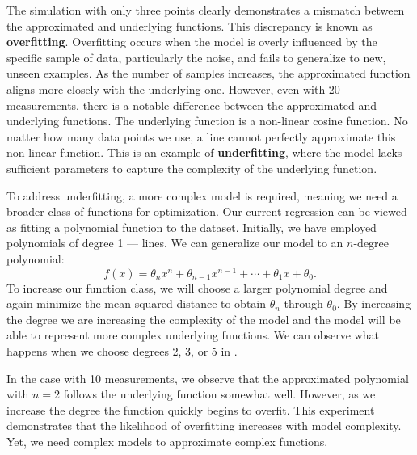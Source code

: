 The simulation with only three points clearly demonstrates a mismatch between the approximated and underlying functions. This discrepancy is known as \textbf{overfitting}. Overfitting occurs when the model is overly influenced by the specific sample of data, particularly the noise, and fails to generalize to new, unseen examples. As the number of samples increases, the approximated function aligns more closely with the underlying one. However, even with 20 measurements, there is a notable difference between the approximated and underlying functions. The underlying function is a non-linear cosine function. No matter how many data points we use, a line cannot perfectly approximate this non-linear function. This is an example of \textbf{underfitting}, where the model lacks sufficient parameters to capture the complexity of the underlying function.

To address underfitting, a more complex model is required, meaning we need a broader class of functions for optimization. Our current regression can be viewed as fitting a polynomial function to the dataset. Initially, we have employed polynomials of degree 1 — lines. We can generalize our model to an $n$-degree polynomial:
\begin{equation}
	f(x) = \theta_n x^n + \theta_{n-1}x^{n-1} + \cdots + \theta_1 x + \theta_0.
\end{equation}
To increase our function class, we will choose a larger polynomial degree and again minimize the mean squared distance to obtain $\theta_n$ through $\theta_0$. By increasing the degree we are increasing the complexity of the model and the model will be able to represent more complex underlying functions. We can observe what happens when we choose degrees 2, 3, or 5 in .

In the case with 10 measurements, we observe that the approximated polynomial with $n = 2$ follows the underlying function somewhat well. However, as we increase the degree the function quickly begins to overfit. This experiment demonstrates that the likelihood of overfitting increases with model complexity. Yet, we need complex models to approximate complex functions.

